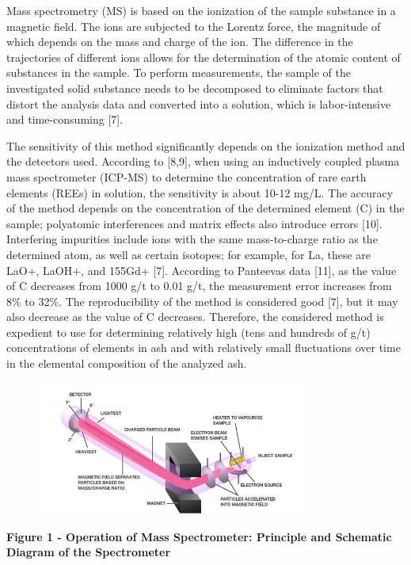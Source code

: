 Mass spectrometry (MS) is based on the ionization of the sample
substance in a magnetic field. The ions are subjected to the Lorentz
force, the magnitude of which depends on the mass and charge of the ion.
The difference in the trajectories of different ions allows for the
determination of the atomic content of substances in the sample. To
perform measurements, the sample of the investigated solid substance
needs to be decomposed to eliminate factors that distort the analysis
data and converted into a solution, which is labor-intensive and
time-consuming {[}7{]}.

The sensitivity of this method significantly depends on the ionization
method and the detectors used. According to {[}8,9{]}, when using an
inductively coupled plasma mass spectrometer (ICP-MS) to determine the
concentration of rare earth elements (REEs) in solution, the sensitivity
is about 10-12 mg/L. The accuracy of the method depends on the
concentration of the determined element (C) in the sample; polyatomic
interferences and matrix effects also introduce errors {[}10{]}.
Interfering impurities include ions with the same mass-to-charge ratio
as the determined atom, as well as certain isotopes; for example, for
La, these are LaO+, LaOH+, and 155Gd+ {[}7{]}. According to
Panteeva\textquotesingle s data {[}11{]}, as the value of C decreases
from 1000 g/t to 0.01 g/t, the measurement error increases from 8\% to
32\%. The reproducibility of the method is considered good {[}7{]}, but
it may also decrease as the value of C decreases. Therefore, the
considered method is expedient to use for determining relatively high
(tens and hundreds of g/t) concentrations of elements in ash and with
relatively small fluctuations over time in the elemental composition of
the analyzed ash.

\begin{figure}[H]
	\centering
	\includegraphics[width=0.8\textwidth]{assets/1049}
	\caption*{}
\end{figure}

{\bfseries Figure 1 - Operation of Mass Spectrometer: Principle and
Schematic Diagram of the Spectrometer}

